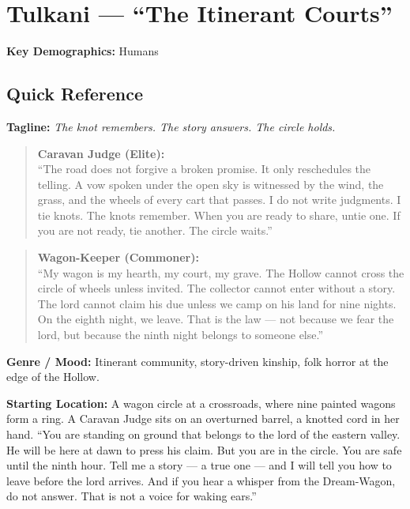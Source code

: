 \section{Tulkani --- ``The Itinerant Courts''}
\label{chap:tulkani}

\textbf{Key Demographics: } Humans

\subsection*{Quick Reference}
\textbf{Tagline:} \textit{The knot remembers. The story answers. The circle holds.}

\begin{quote}
  \textbf{Caravan Judge (Elite):}\\
  ``The road does not forgive a broken promise. It only reschedules the telling. A vow spoken under the open sky is witnessed by the wind, the grass, and the wheels of every cart that passes. I do not write judgments. I tie knots. The knots remember. When you are ready to share, untie one. If you are not ready, tie another. The circle waits.''
\end{quote}

\begin{quote}
  \textbf{Wagon-Keeper (Commoner):}\\
  ``My wagon is my hearth, my court, my grave. The Hollow cannot cross the circle of wheels unless invited. The collector cannot enter without a story. The lord cannot claim his due unless we camp on his land for nine nights. On the eighth night, we leave. That is the law --- not because we fear the lord, but because the ninth night belongs to someone else.''
\end{quote}

\noindent\textbf{Genre / Mood:} Itinerant community, story-driven kinship, folk horror at the edge of the Hollow.

\noindent\textbf{Starting Location:} A wagon circle at a crossroads, where nine painted wagons form a ring. A Caravan Judge sits on an overturned barrel, a knotted cord in her hand. ``You are standing on ground that belongs to the lord of the eastern valley. He will be here at dawn to press his claim. But you are in the circle. You are safe until the ninth hour. Tell me a story --- a true one --- and I will tell you how to leave before the lord arrives. And if you hear a whisper from the Dream-Wagon, do not answer. That is not a voice for waking ears.''

